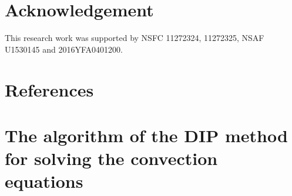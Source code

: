 \documentclass{article}
\theoremstyle{plain}\newtheorem{definition}{\sc{Definition}}
\theoremstyle{defination}\newtheorem{example}{Example}[section]
\numberwithin{equation}{section}
\numberwithin{table}{section}
\begin{document}
{%
%
%
%
%
%
\section*{Acknowledgement} 
This research work was supported by NSFC 11272324, 11272325, NSAF U1530145 and 2016YFA0401200.

\section*{References}



\newpage
  \appendix
  \renewcommand{\appendixname}{Appendix~}

  \section{The algorithm of the DIP method for solving the convection equations}
\large {\color{black!60!red!80!}}
  \color{black}

}
\end{document}
